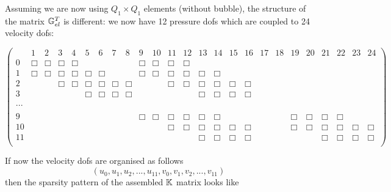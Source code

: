 Assuming we are now using $Q_1\times Q_1$ elements (without bubble), 
the structure of the matrix ${\mathbb{G}}_{el}^T$ is different: we now have 12 pressure dofs 
which are coupled to 24 velocity dofs:
\begin{scriptsize}
\begin{equation}
\left(
\begin{array}{ccccccccccccccccccccccccc}
 & 1 & 2 & 3 & 4 & 5 & 6 & 7 & 8 & 9 & 10 & 11 & 12 & 13 & 14 & 15 & 16 & 17 & 18 & 19 & 20 & 21 & 22 & 23 & 24    \\
0 &\Box&\Box & \Box&\Box &  &  &  &  & \Box&\Box & \Box&\Box &  &  &  &  &  &  &  &  &  &  &  &  \\
1 & \Box&\Box & \Box&\Box & \Box  & \Box  &  &  & \Box&\Box & \Box&\Box & \Box  & \Box  &  &  &  &  &  &  &  &  &  & \\
2 &  & & \Box&\Box & \Box  & \Box  & \Box  & \Box  & & & \Box&\Box & \Box  & \Box  & \Box  &\Box  &  &  &  &  &  &  &  & \\ 
3 &  & & &  & \Box  & \Box  & \Box  & \Box  & & & & & \Box  & \Box  & \Box  &\Box  &  &  &  &  &  &  &  & \\ 
\\
... \\
\\
9 & & & & & & & & &\Box &\Box &\Box &\Box & \Box  & \Box &  &  & & &\Box &\Box & \Box &\Box & &  \\
10 & & & & & & & & & & &\Box &\Box & \Box  & \Box & \Box & \Box & & &\Box &\Box & \Box &\Box &\Box & \Box \\
11 & & & & & & & & & & & & & \Box  & \Box & \Box & \Box & & & & & \Box &\Box &\Box & \Box \\
\end{array}
\right)
\end{equation} 
\end{scriptsize}

If now the velocity dofs are organised as follows 
\[
(u_0,u_1,u_2,...,u_{11},v_0,v_1,v_2,...,v_{11})
\]
then the sparsity pattern of the assembled ${\mathbb{K}}$ matrix looks like 


